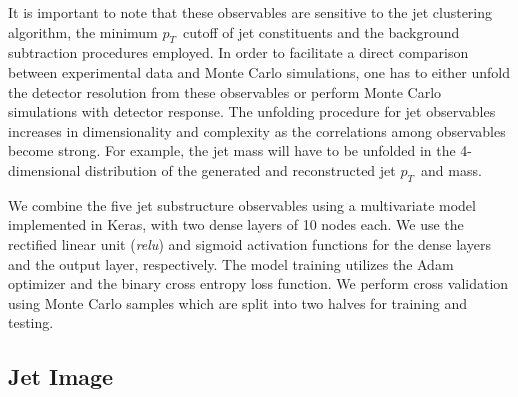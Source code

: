 \documentclass[notoc]{JHEP3}
\newcommand{\pt}{$p_{T}$}
\newcommand{\jw}{\textsc{Jewel}}
\begin{document}
It is important to note that these observables are sensitive to the jet clustering algorithm, the minimum \pt ~cutoff of jet constituents and the background subtraction procedures employed. In order to facilitate a direct comparison between experimental data and Monte Carlo simulations, one has to either unfold the detector resolution from these observables or perform Monte Carlo simulations with detector response. The unfolding procedure for jet observables increases in dimensionality and complexity as the correlations among observables become strong. For example, the jet mass will have to be unfolded in the 4-dimensional distribution of the generated and reconstructed jet \pt ~and mass.

We combine the five jet substructure observables using a multivariate model implemented in Keras, with two dense layers of 10 nodes each. We use the rectified linear unit (\textit{relu}) and sigmoid activation functions for the dense layers and the output layer, respectively. The model training utilizes the Adam optimizer and the binary cross entropy loss function. We perform cross validation using Monte Carlo samples which are split into two halves for training and testing.


\subsection{Jet Image}
\label{sec:image}
\end{document}
